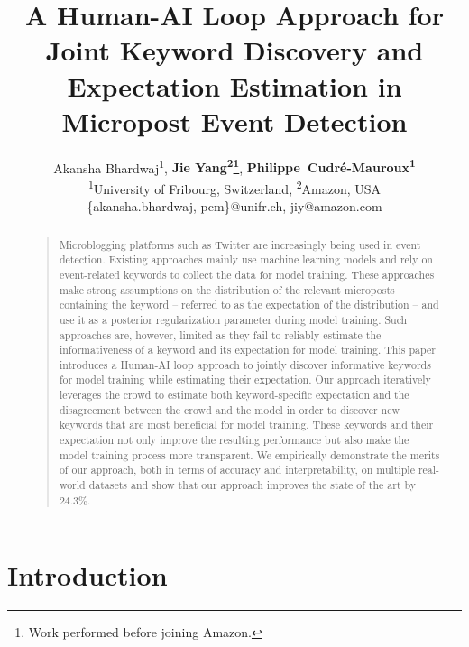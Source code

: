 \documentclass[letterpaper]{article}
\title{A Human-AI Loop Approach for Joint Keyword Discovery and Expectation Estimation in Micropost Event Detection}
\author{Akansha Bhardwaj\textsuperscript{\rm 1},  \Large \textbf{Jie Yang\textsuperscript{\rm 2}\thanks{Work performed before joining Amazon.}}, \Large \textbf{Philippe~Cudr\'e-Mauroux\textsuperscript{\rm 1}}\\ %
\textsuperscript{\rm 1}University of Fribourg, Switzerland, \textsuperscript{\rm 2}Amazon, USA\\ %
\{akansha.bhardwaj, pcm\}@unifr.ch, jiy@amazon.com\\ %
}
\begin{document}
\maketitle
\begin{abstract}
\begin{quote}

Microblogging platforms such as Twitter are increasingly being used in
event detection.
Existing approaches mainly use machine learning models and rely on event-related keywords to collect the data for model training. These approaches make strong assumptions on the distribution of the relevant microposts containing the keyword -- referred to as the expectation of the distribution -- and use it as a posterior regularization parameter during model training. Such approaches are, however, limited as they fail to reliably estimate the informativeness of a keyword and its expectation for model training. This paper introduces a Human-AI loop approach to jointly discover informative keywords for model training while estimating their expectation. Our approach iteratively leverages the crowd to estimate both keyword-specific expectation and the disagreement between the crowd and the model in order to discover new keywords that are most beneficial for model training. These keywords and their expectation not only improve the resulting performance but also make the model training process more transparent. We empirically demonstrate the merits of our approach, both in terms of accuracy and interpretability, on multiple real-world datasets and show that our approach improves the state of the art by 24.3\%.

\end{quote}
\end{abstract}

\section{Introduction}
\end{document}
